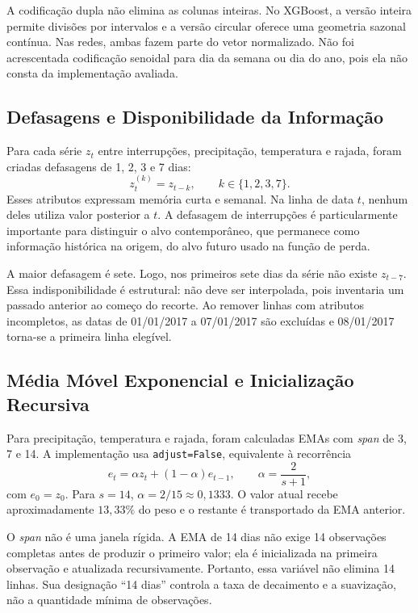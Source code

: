 A codificação dupla não elimina as colunas inteiras. No XGBoost, a versão inteira permite divisões por intervalos e a versão circular oferece uma geometria sazonal contínua. Nas redes, ambas fazem parte do vetor normalizado. Não foi acrescentada codificação senoidal para dia da semana ou dia do ano, pois ela não consta da implementação avaliada.

\subsection{Defasagens e Disponibilidade da Informação}

Para cada série $z_t$ entre interrupções, precipitação, temperatura e rajada, foram criadas defasagens de 1, 2, 3 e 7 dias:
\begin{equation}
    z_{t}^{(k)}=z_{t-k}, \qquad k\in\{1,2,3,7\}.
\end{equation}
Esses atributos expressam memória curta e semanal. Na linha de data $t$, nenhum deles utiliza valor posterior a $t$. A defasagem de interrupções é particularmente importante para distinguir o alvo contemporâneo, que permanece como informação histórica na origem, do alvo futuro usado na função de perda.

A maior defasagem é sete. Logo, nos primeiros sete dias da série não existe $z_{t-7}$. Essa indisponibilidade é estrutural: não deve ser interpolada, pois inventaria um passado anterior ao começo do recorte. Ao remover linhas com atributos incompletos, as datas de 01/01/2017 a 07/01/2017 são excluídas e 08/01/2017 torna-se a primeira linha elegível.

\subsection{Média Móvel Exponencial e Inicialização Recursiva}

Para precipitação, temperatura e rajada, foram calculadas EMAs com \textit{span} de 3, 7 e 14. A implementação usa \texttt{adjust=False}, equivalente à recorrência
\begin{equation}
    e_t=\alpha z_t+(1-\alpha)e_{t-1}, \qquad
    \alpha=\frac{2}{s+1},
\end{equation}
com $e_0=z_0$. Para $s=14$, $\alpha=2/15\approx0{,}1333$. O valor atual recebe aproximadamente $13{,}33\%$ do peso e o restante é transportado da EMA anterior.

O \textit{span} não é uma janela rígida. A EMA de 14 dias não exige 14 observações completas antes de produzir o primeiro valor; ela é inicializada na primeira observação e atualizada recursivamente. Portanto, essa variável não elimina 14 linhas. Sua designação ``14 dias'' controla a taxa de decaimento e a suavização, não a quantidade mínima de observações.

